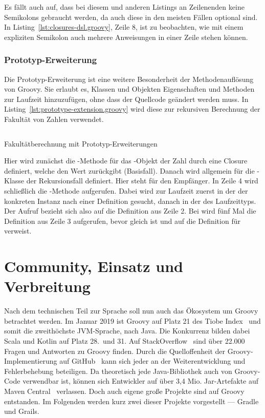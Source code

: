 \documentclass[a4paper]{article}
\newcommand{\codelisting}[3]{
\begin{listing}[ht]
	\inputminted{#1}{#1/#2}
	\vspace{-3ex}
	\caption{#3}
	\label{lst:#2}
\end{listing}
}
\begin{document}
Es fällt auch auf, dass bei diesem und anderen Listings an Zeilenenden keine Semikolons gebraucht werden, da auch diese in den meisten Fällen optional sind.
In Listing~\ref{lst:closures-dsl.groovy}, Zeile 8, ist zu beobachten, wie mit einem expliziten Semikolon auch mehrere Anweisungen in einer Zeile stehen können.

\subsubsection{Prototyp-Erweiterung}

Die Prototyp-Erweiterung ist eine weitere Besonderheit der Methodenauflösung von Groovy.
Sie erlaubt es, Klassen und Objekten Eigenschaften und Methoden zur Laufzeit hinzuzufügen, ohne dass der Quellcode geändert werden muss.
In Listing~\ref{lst:prototype-extension.groovy} wird diese zur rekursiven Berechnung der Fakultät von Zahlen verwendet.

\codelisting{groovy}{prototype-extension.groovy}{Fakultätberechnung mit Prototyp-Erweiterungen}

Hier wird zunächst die -Methode für das -Objekt der Zahl  durch eine Closure definiert, welche den Wert  zurückgibt (Basisfall).
Danach wird allgemein für die -Klasse der Rekursionsfall definiert.
Hier steht  für den Empfänger.
In Zeile 4 wird schließlich die -Methode aufgerufen.
Dabei wird zur Laufzeit zuerst in der  der konkreten Instanz nach einer Definition gesucht, danach in der  des Laufzeittyps.
Der Aufruf  bezieht sich also auf die Definition aus Zeile 2.
Bei  wird fünf Mal die Definition aus Zeile 3 aufgerufen, bevor  gleich  ist und  auf die Definition für  verweist.


\section{Community, Einsatz und Verbreitung}\label{sec:community}

Nach dem technischen Teil zur Sprache soll nun auch das Ökosystem um Groovy betrachtet werden.
Im Januar 2019 ist Groovy auf Platz 21 des Tiobe Index~\cite{tiobe-index} und somit die zweithöchste JVM-Sprache, nach Java.
Die Konkurrenz bilden dabei Scala und Kotlin auf Platz 28.~und 31.
Auf StackOverflow~\cite{stackoverflow:groovy} sind über 22.000 Fragen und Antworten zu Groovy finden.
Durch die Quelloffenheit der Groovy-Implementierung auf GitHub~\cite{github:groovy} kann sich jeder an der Weiterentwicklung und Fehlerbehebung beteiligen.
Da theoretisch jede Java-Bibliothek auch von Groovy-Code verwendbar ist, können sich Entwickler auf über 3,4 Mio. Jar-Artefakte auf Maven Central~\cite{maven-central} verlassen.
Doch auch eigene große Projekte sind auf Groovy entstanden.
Im Folgenden werden kurz zwei dieser Projekte vorgestellt --- Gradle und Grails.
\end{document}

